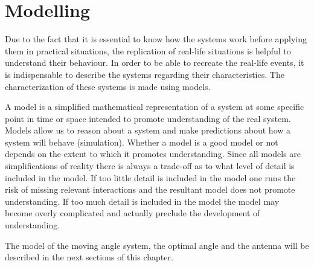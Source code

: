 \chapter{Modelling}\label{ch:model}

Due to the fact that it is essential to know how the systems work before applying them in practical situations, the replication of real-life situations is helpful to understand their behaviour. In order to be able to recreate the real-life events, it is indispensable to describe the systems regarding their characteristics. The characterization of these systems is made using models.  

A model is a simplified mathematical representation of a system at some specific point in time or space intended to promote understanding of the real system. Models allow us to reason about a system and make predictions about how a system will behave (simulation). Whether a model is a good model or not depends on the extent to which it promotes understanding. Since all models are simplifications of reality there is always a trade-off as to what level of detail is included in the model. If too little detail is included in the model one runs the risk of missing relevant interactions and the resultant model does not promote understanding. If too much detail is included in the model the model may become overly complicated and actually preclude the development of understanding. 

The model of the moving angle system, the optimal angle and the antenna will be described in the next sections of this chapter.